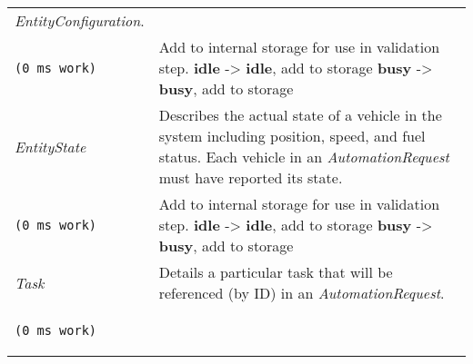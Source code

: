 \begin{longtable}[c]{@{}ll@{}}
\begin{minipage}[t]{0.65\columnwidth}
\emph{EntityConfiguration}.
\strut\end{minipage}\tabularnewline
\begin{minipage}[t]{0.29\columnwidth}\raggedright\strut
\begin{verbatim}
(0 ms work)
\end{verbatim}
\strut\end{minipage} &
\begin{minipage}[t]{0.65\columnwidth}\raggedright\strut
Add to internal storage for use in validation step. \textbf{idle}
-\textgreater{} \textbf{idle}, add to storage \textbf{busy}
-\textgreater{} \textbf{busy}, add to storage
\strut\end{minipage}\tabularnewline
\begin{minipage}[t]{0.29\columnwidth}\raggedright\strut
\emph{EntityState}
\strut\end{minipage} &
\begin{minipage}[t]{0.65\columnwidth}\raggedright\strut
Describes the actual state of a vehicle in the system including
position, speed, and fuel status. Each vehicle in an
\emph{AutomationRequest} must have reported its state.
\strut\end{minipage}\tabularnewline
\begin{minipage}[t]{0.29\columnwidth}\raggedright\strut
\begin{verbatim}
(0 ms work)
\end{verbatim}
\strut\end{minipage} &
\begin{minipage}[t]{0.65\columnwidth}\raggedright\strut
Add to internal storage for use in validation step. \textbf{idle}
-\textgreater{} \textbf{idle}, add to storage \textbf{busy}
-\textgreater{} \textbf{busy}, add to storage
\strut\end{minipage}\tabularnewline
\begin{minipage}[t]{0.29\columnwidth}\raggedright\strut
\emph{Task}
\strut\end{minipage} &
\begin{minipage}[t]{0.65\columnwidth}\raggedright\strut
Details a particular task that will be referenced (by ID) in an
\emph{AutomationRequest}.
\strut\end{minipage}\tabularnewline
\begin{minipage}[t]{0.29\columnwidth}\raggedright\strut
\begin{verbatim}
(0 ms work)
\end{verbatim}
\strut\end{minipage} &
\begin{minipage}[t]{0.65\columnwidth}\raggedright\strut

\end{minipage}
\end{longtable}
